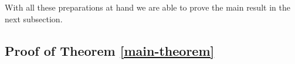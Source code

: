 \documentclass{article}
\newtheorem{theorem}{Theorem}[section]
\theoremstyle{definition}
\theoremstyle{definition}
\newcommand{\Pra}{\rm{Pr}}
\newcommand{\Ra}{{\rm{Ra}}}
\newcommand{\Nu}{{\rm{Nu}}}
\begin{document}
With all these preparations at hand we are able to prove the main result in the next subsection.
\subsection{Proof of Theorem \ref{main-theorem}}
\end{document}

